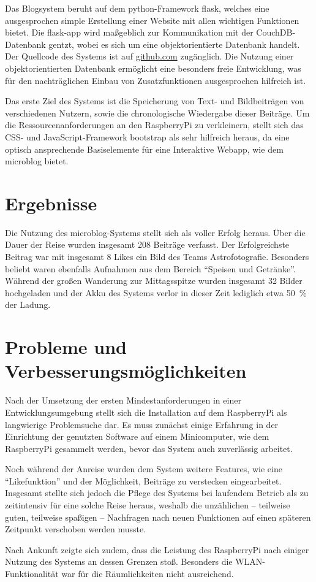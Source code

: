 Das Blogsystem beruht auf dem python-Framework flask, welches eine
ausgesprochen simple Erstellung einer Website mit allen wichtigen Funktionen
bietet.
Die flask-app wird maßgeblich zur Kommunikation mit der CouchDB-Datenbank
gentzt, wobei es sich um eine objektorientierte Datenbank handelt.
Der Quellcode des Systems ist auf
\href{https://github.com/bixel/microblog}{github.com} zugänglich.
Die Nutzung einer objektorientierten Datenbank ermöglicht eine besonders
freie Entwicklung, was für den nachträglichen Einbau von Zusatzfunktionen
ausgesprochen hilfreich ist.

Das erste Ziel des Systems ist die Speicherung von Text- und Bildbeiträgen
von verschiedenen Nutzern, sowie die chronologische Wiedergabe dieser Beiträge.
Um die Ressourcenanforderungen an den RaspberryPi zu verkleinern,
stellt sich das CSS- und JavaScript-Framework bootstrap als sehr hilfreich
heraus, da eine optisch ansprechende Basiselemente für eine Interaktive
Webapp, wie dem microblog bietet.

\section{Ergebnisse}
Die Nutzung des microblog-Systems stellt sich als voller Erfolg heraus.
Über die Dauer der Reise wurden insgesamt 208 Beiträge verfasst.
Der Erfolgreichste Beitrag war mit insgesamt \num{8} Likes ein Bild
des Teams Astrofotografie.
Besonders beliebt waren ebenfalls Aufnahmen aus dem Bereich
\enquote{Speisen und Getränke}.
Während der großen Wanderung zur Mittagsspitze wurden insgesamt \num{32}
Bilder hochgeladen und der Akku des Systems verlor in dieser Zeit
lediglich etwa \SI{50}{\percent} der Ladung.

\section{Probleme und Verbesserungsmöglichkeiten}
Nach der Umsetzung der ersten Mindestanforderungen in einer
Entwicklungsumgebung stellt sich die Installation auf dem RaspberryPi als
langwierige Problemsuche dar.
Es muss zunächst einige Erfahrung in der Einrichtung der genutzten Software auf
einem Minicomputer, wie dem RaspberryPi gesammelt werden, bevor das System auch
zuverlässig arbeitet.

Noch während der Anreise wurden dem System weitere Features, wie eine
\enquote{Likefunktion} und der Möglichkeit, Beiträge zu verstecken
eingearbeitet.
Insgesamt stellte sich jedoch die Pflege des Systems bei laufendem Betrieb als
zu zeitintensiv für eine solche Reise heraus, weshalb die unzählichen
-- teilweise guten, teilweise spaßigen -- Nachfragen nach neuen Funktionen
auf einen späteren Zeitpunkt verschoben werden musste.

Nach Ankunft zeigte sich zudem, dass die Leistung des RaspberryPi nach einiger
Nutzung des Systems an dessen Grenzen stoß. Besonders die WLAN-Funktionalität
war für die Räumlichkeiten nicht ausreichend.

